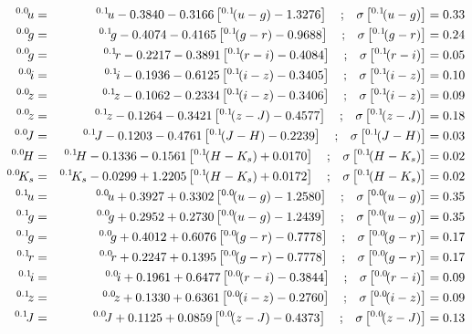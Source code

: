 \documentclass[10pt,preprint]{aastex}
\newcommand{\band}[2]{\ensuremath{^{{#1}}\!{#2}}}
\begin{document}
 
\begin{eqnarray}
\band{0.0}{u} &=& \band{0.1}{u} - 0.3840 - 0.3166 \left[ \band{0.1}{(u-g)} - 1.3276 \right] \quad \mathrm{;}  \quad \sigma\left[\band{0.1}{(u-g)}\right] = 0.33\cr
\band{0.0}{g} &=& \band{0.1}{g} - 0.4074 - 0.4165 \left[ \band{0.1}{(g-r)} - 0.9688 \right] \quad \mathrm{;}  \quad \sigma\left[\band{0.1}{(g-r)}\right] = 0.24\cr
\band{0.0}{g} &=& \band{0.1}{r} - 0.2217 - 0.3891 \left[ \band{0.1}{(r-i)} - 0.4084 \right] \quad \mathrm{;}  \quad \sigma\left[\band{0.1}{(r-i)}\right] = 0.05\cr
\band{0.0}{i} &=& \band{0.1}{i} - 0.1936 - 0.6125 \left[ \band{0.1}{(i-z)} - 0.3405 \right] \quad \mathrm{;}  \quad \sigma\left[\band{0.1}{(i-z)}\right] = 0.10\cr
\band{0.0}{z} &=& \band{0.1}{z} - 0.1062 - 0.2334 \left[ \band{0.1}{(i-z)} - 0.3406 \right] \quad \mathrm{;}  \quad \sigma\left[\band{0.1}{(i-z)}\right] = 0.09\cr
\band{0.0}{z} &=& \band{0.1}{z} - 0.1264 - 0.3421 \left[ \band{0.1}{(z-J)} - 0.4577 \right] \quad \mathrm{;}  \quad \sigma\left[\band{0.1}{(z-J)}\right] = 0.18\cr
\band{0.0}{J} &=& \band{0.1}{J} - 0.1203 - 0.4761 \left[ \band{0.1}{(J-H)} - 0.2239 \right] \quad \mathrm{;}  \quad \sigma\left[\band{0.1}{(J-H)}\right] = 0.03\cr
\band{0.0}{H} &=& \band{0.1}{H} - 0.1336 - 0.1561 \left[ \band{0.1}{(H-K_s)} + 0.0170 \right] \quad \mathrm{;}  \quad \sigma\left[\band{0.1}{(H-K_s)}\right] = 0.02\cr
\band{0.0}{K_s} &=& \band{0.1}{K_s} - 0.0299 + 1.2205 \left[ \band{0.1}{(H-K_s)} + 0.0172 \right] \quad \mathrm{;}  \quad \sigma\left[\band{0.1}{(H-K_s)}\right] = 0.02\cr
\band{0.1}{u} &=& \band{0.0}{u} + 0.3927 + 0.3302 \left[ \band{0.0}{(u-g)} - 1.2580 \right] \quad \mathrm{;}  \quad \sigma\left[\band{0.0}{(u-g)}\right] = 0.35\cr
\band{0.1}{g} &=& \band{0.0}{g} + 0.2952 + 0.2730 \left[ \band{0.0}{(u-g)} - 1.2439 \right] \quad \mathrm{;}  \quad \sigma\left[\band{0.0}{(u-g)}\right] = 0.35\cr
\band{0.1}{g} &=& \band{0.0}{g} + 0.4012 + 0.6076 \left[ \band{0.0}{(g-r)} - 0.7778 \right] \quad \mathrm{;}  \quad \sigma\left[\band{0.0}{(g-r)}\right] = 0.17\cr
\band{0.1}{r} &=& \band{0.0}{r} + 0.2247 + 0.1395 \left[ \band{0.0}{(g-r)} - 0.7778 \right] \quad \mathrm{;}  \quad \sigma\left[\band{0.0}{(g-r)}\right] = 0.17\cr
\band{0.1}{i} &=& \band{0.0}{i} + 0.1961 + 0.6477 \left[ \band{0.0}{(r-i)} - 0.3844 \right] \quad \mathrm{;}  \quad \sigma\left[\band{0.0}{(r-i)}\right] = 0.09\cr
\band{0.1}{z} &=& \band{0.0}{z} + 0.1330 + 0.6361 \left[ \band{0.0}{(i-z)} - 0.2760 \right] \quad \mathrm{;}  \quad \sigma\left[\band{0.0}{(i-z)}\right] = 0.09\cr
\band{0.1}{J} &=& \band{0.0}{J} + 0.1125 + 0.0859 \left[ \band{0.0}{(z-J)} - 0.4373 \right] \quad \mathrm{;}  \quad \sigma\left[\band{0.0}{(z-J)}\right] = 0.13\cr

\end{eqnarray}
\end{document}
